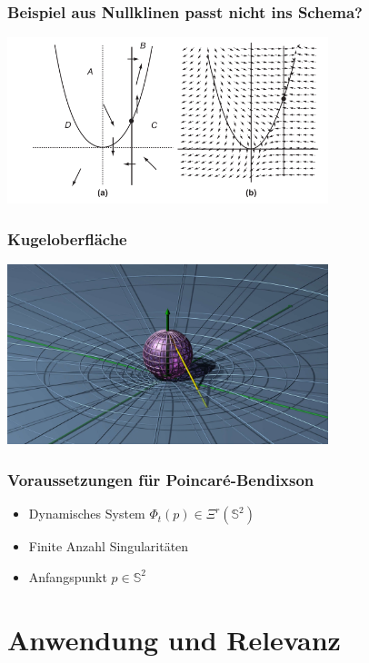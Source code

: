 \documentclass[ngerman, aspectratio=169]{beamer}
\begin{document}
    \begin{frame}
    \frametitle{Beispiel aus Nullklinen passt nicht ins Schema?}
        \begin{center}
            \includegraphics[width=0.7\textwidth]{../images/nullklinen.pdf}
        \end{center}
    \end{frame}
    \begin{frame}
    \frametitle{Kugeloberfläche}
        \begin{center}
            \includegraphics[width=0.7\textwidth]{../images/kugel_animation_thumbnail.jpg}
        \end{center}
    \end{frame}
    \begin{frame}
    \frametitle{Voraussetzungen für Poincaré-Bendixson}
        \begin{itemize}
            \item Dynamisches System $\Phi_t(p) \in \Xi^r(\mathbb{S}^2)$
            \item Finite Anzahl Singularitäten
            \item Anfangspunkt $p \in \mathbb{S}^2$
        \end{itemize}
    \end{frame}

    \section{Anwendung und Relevanz}
\end{document}
